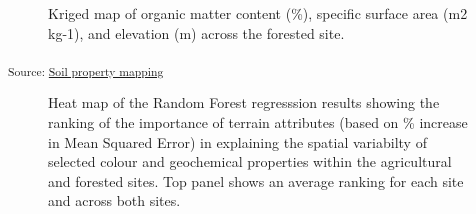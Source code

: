 \documentclass[
  number]{elsarticle}
\begin{document}
\begin{figure}[H]


\caption{\label{fig-forest_map2}Kriged map of organic matter content
(\%), specific surface area (m2 kg-1), and elevation (m) across the
forested site.}

\end{figure}%

\textsubscript{Source:
\href{https://alex-koiter.github.io/spatial-variability-soil-manuscript/notebooks/soil_property_maps.qmd.html\#cell-fig-forest_map2}{Soil
property mapping}}

\begin{figure}[H]


\caption{\label{fig-rf-results}Heat map of the Random Forest regresssion
results showing the ranking of the importance of terrain attributes
(based on \% increase in Mean Squared Error) in explaining the spatial
variabilty of selected colour and geochemical properties within the
agricultural and forested sites. Top panel shows an average ranking for
each site and across both sites.}

\end{figure}%
\end{document}
